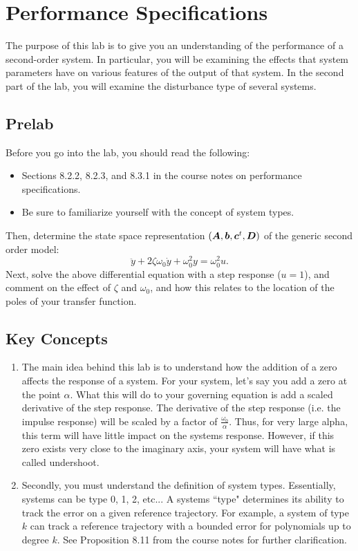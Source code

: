 \chapter{Performance Specifications}

The purpose of this lab is to give you an understanding of the performance of
a second-order system.  In particular, you will be examining the effects that
system parameters have on various features of the output of that system.  In
the second part of the lab, you will examine the disturbance type of several
systems.

\section{Prelab}

Before you go into the lab, you should read the following:
\begin{itemize}
\item Sections 8.2.2, 8.2.3, and 8.3.1 in the course notes on performance specifications.
\item Be sure to familiarize yourself with the concept of system types. 
\end{itemize}
Then, determine the state space representation
$(\boldsymbol{A},\boldsymbol{b},\boldsymbol{c}^{t},\boldsymbol{D})$ of the generic second order model:
\begin{equation*}
\ddot y +2\zeta\omega_{0}\dot y+\omega_{0}^{2}y=\omega_{0}^{2}u.
\end{equation*}
Next, solve the above differential equation with a step response ($u = 1$), 
and comment on the effect of $\zeta$ and $\omega_0$, and how this relates to 
the location of the poles of your transfer function. 

\section{Key Concepts}

\begin{enumerate}
\item The main idea behind this lab is to understand how the addition of a zero 
affects the response of a system. For your system, let's say you add a zero at the 
point $\alpha$. What this will do to your governing equation is add a scaled derivative 
of the step response. The derivative of the step response (i.e. the impulse response)  
will be scaled by a factor of $\frac{\omega_0}{\alpha}$. Thus, for very large alpha, 
this term will have little impact on the systems response. However, if this zero exists 
very close to the imaginary axis, your system will have what is called undershoot.
\item Secondly, you must understand the definition of system types. Essentially, 
systems can be type 0, 1, 2, etc... A systems ``type" determines its ability to track 
the error on a given reference trajectory. For example, a system of type $k$ can track 
a reference trajectory with a bounded error for polynomials up to degree $k$. See Proposition 
8.11 from the course notes for further clarification. 


\end{enumerate}

